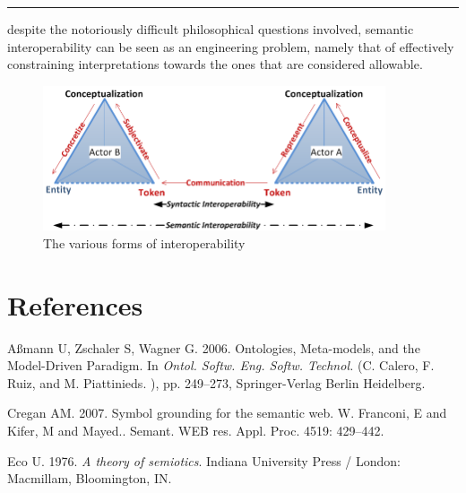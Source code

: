 \documentclass[a4paper,11pt,oneside,oldfontcommands]{memoir}
\theoremstyle{definition}
\theoremstyle{break}		%
\numberwithin{equation}{chapter}
\numberwithin{figure}{chapter}
\begin{document}
\begin{center}\rule{0.5\linewidth}{\linethickness}\end{center}

despite the notoriously difficult philosophical questions involved,
semantic interoperability can be seen as an engineering problem, namely
that of effectively constraining interpretations towards the ones that
are considered allowable.

\begin{figure}
\hypertarget{fig:2semiotic-triangles}{%
\centering
\includegraphics[width=0.9\textwidth,height=\textheight]{./tex2pdf.9980/fac83dcaa0ef39be01bcba4da966101b9332f127.png}
\caption{The various forms of
interoperability}\label{fig:2semiotic-triangles}
}
\end{figure}

\hypertarget{references}{%
\chapter*{References}\label{references}}

\setlength{\parindent}{-0.2in}

\setlength{\leftskip}{0.2in}

\setlength{\parskip}{8pt}

\hypertarget{refs}{}
\leavevmode\hypertarget{ref-Auxdfmann2006}{}%
Aßmann U, Zschaler S, Wagner G. 2006. Ontologies, Meta-models, and the
Model-Driven Paradigm. In \emph{Ontol. Softw. Eng. Softw. Technol.} (C.
Calero, F. Ruiz, and M. Piattinieds. ), pp. 249--273, Springer-Verlag
Berlin Heidelberg.

\leavevmode\hypertarget{ref-Cregan2007}{}%
Cregan AM. 2007. Symbol grounding for the semantic web. W. Franconi, E
and Kifer, M and Mayed.. Semant. WEB res. Appl. Proc. 4519: 429--442.

\leavevmode\hypertarget{ref-Eco1976}{}%
Eco U. 1976. \emph{A theory of semiotics}. Indiana University Press /
London: Macmillam, Bloomington, IN.
\end{document}
